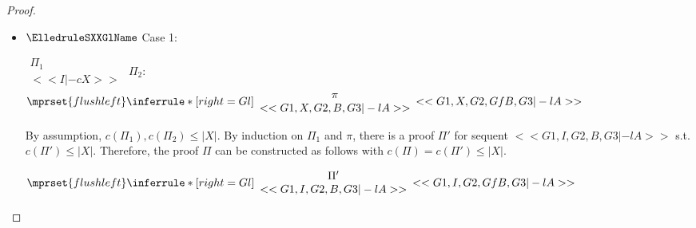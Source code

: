 \begin{proof}
\begin{enumerate}
\begin{itemize}
  \item $\ElledruleSXXGlName$ Case 1:
    \begin{center}
      \scriptsize
      \begin{math}
        \begin{array}{c}
          \Pi_1 \\
          {<<I |-c X>>}
        \end{array}
      \end{math}
      \qquad\qquad
      $\Pi_2$:
      \begin{math}
        $$\mprset{flushleft}
        \inferrule* [right={\tiny Gl}] {
          {
            \begin{array}{c}
              \pi \\
              {<<G1, X, G2, B, G3 |-l A>>}
            \end{array}
          }
        }{<<G1, X, G2, Gf B, G3 |-l A>>}
      \end{math}
    \end{center}
    By assumption, $c(\Pi_1),c(\Pi_2)\leq |X|$. By induction on $\Pi_1$ and $\pi$, there is a
    proof $\Pi'$ for sequent $<<G1, I, G2, B, G3 |-l A>>$ s.t. $c(\Pi') \leq |X|$. Therefore,
    the proof $\Pi$ can be constructed as follows with $c(\Pi) = c(\Pi') \leq |X|$.
    \begin{center}
      \scriptsize
      \begin{math}
        $$\mprset{flushleft}
        \inferrule* [right={\tiny Gl}] {
          {
            \begin{array}{c}
              \Pi' \\
              {<<G1, I, G2, B, G3 |-l A>>}
            \end{array}
          }
        }{<<G1, I, G2, Gf B, G3 |-l A>>}
      \end{math}
    \end{center}


\end{itemize}
\end{enumerate}
\end{proof}
